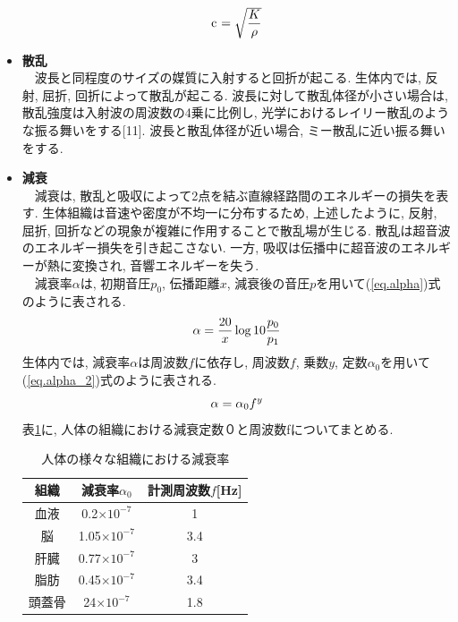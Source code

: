 \begin{itemize}
\begin{equation}
\label{eq.c}
\\$c$\ = \sqrt{\dfrac{K}{\rho}}
\end{equation}
\item{\bf 散乱}
\\\ \ 波長と同程度のサイズの媒質に入射すると回折が起こる. 生体内では, 反射, 屈折, 回折によって散乱が起こる. 波長に対して散乱体径が小さい場合は, 散乱強度は入射波の周波数の4乗に比例し, 光学におけるレイリー散乱のような振る舞いをする[11]. 波長と散乱体径が近い場合, ミー散乱に近い振る舞いをする. 
\item{\bf 減衰}
\\\ \ 減衰は, 散乱と吸収によって2点を結ぶ直線経路間のエネルギーの損失を表す. 生体組織は音速や密度が不均一に分布するため, 上述したように, 反射, 屈折, 回折などの現象が複雑に作用することで散乱場が生じる. 散乱は超音波のエネルギー損失を引き起こさない. 一方, 吸収は伝播中に超音波のエネルギーが熱に変換され, 音響エネルギーを失う.
\\\ \ 減衰率$\alpha$は, 初期音圧$p_0$, 伝播距離$x$, 減衰後の音圧$p$を用いて(\ref{eq.alpha})式のように表される.
\begin{equation}
\label{eq.alpha}
\\\alpha = \frac{20}{x}  \log{10} \frac{p_0}{p_1}
\end{equation}
生体内では, 減衰率$\alpha$は周波数$f$に依存し, 周波数$f$, 乗数$y$, 定数$\alpha_0$を用いて(\ref{eq.alpha_2})式のように表される.
\begin{equation}
\label{eq.alpha_2}
\\\alpha = \alpha_0f^y
\end{equation}
表\ref{table_soshiki}に, 人体の組織における減衰定数０と周波数fについてまとめる.

\begin{table}[htb]
\centering
\caption{人体の様々な組織における減衰率}
\label{table_soshiki}
\begin{tabular}{|c|c|c|}
\hline
組織 & 減衰率$\alpha_0$ & 計測周波数$f$[Hz]  \\ \hline
血液 & 0.2$\times$$10^{-7}$ &      1 \\ \hline
脳   & 1.05$\times$$10^{-7}$ &      3.4\\ \hline
肝臓  & 0.77$\times$$10^{-7}$ &     3 \\ \hline
脂肪 & 0.45$\times$$10^{-7}$ &     3.4 \\ \hline
頭蓋骨  & 24$\times$$10^{-7}$ &     1.8  \\ \hline
\end{tabular}
\end{table}

\end{itemize}
